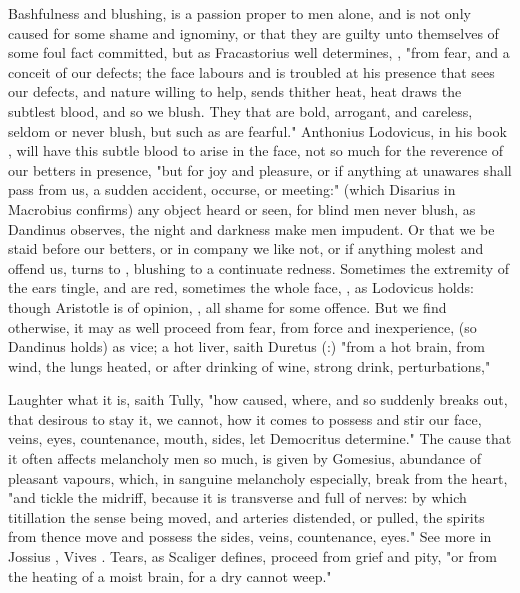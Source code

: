 {Bashfulness and blushing, is a passion proper to men
alone, and is not only caused for some shame and ignominy,
or that they are guilty unto themselves of some foul fact committed, but as
Fracastorius well determines, , "from fear, and a conceit of our defects; the face labours and is
troubled at his presence that sees our defects, and nature willing to help,
sends thither heat, heat draws the subtlest blood, and so we blush. They that
are bold, arrogant, and careless, seldom or never blush, but such as are
fearful." Anthonius Lodovicus, in his book ,
will have this subtle blood to arise in the face, not so much for the reverence
of our betters in presence, "but for joy and pleasure, or
if anything at unawares shall pass from us, a sudden accident, occurse, or
meeting:" (which Disarius in Macrobius confirms) any
object heard or seen, for blind men never blush, as Dandinus observes, the
night and darkness make men impudent. Or that we be staid before our betters,
or in company we like not, or if anything molest and offend us,
 turns to , blushing to a continuate redness.
Sometimes the extremity of the ears tingle, and are red,
sometimes the whole face, , as Lodovicus
holds: though Aristotle is of opinion, , all
shame for some offence. But we find otherwise, it may as well proceed
from fear, from force and inexperience, (so
Dandinus holds) as vice; a hot liver, saith Duretus
(:) "from a hot brain, from wind, the lungs heated, or
after drinking of wine, strong drink, perturbations," \etc{}

Laughter what it is, saith Tully, "how caused, where, and
so suddenly breaks out, that desirous to stay it, we cannot, how it comes to
possess and stir our face, veins, eyes, countenance, mouth, sides, let
Democritus determine." The cause that it often affects melancholy men so much,
is given by Gomesius, 
abundance of pleasant vapours, which, in sanguine melancholy especially, break
from the heart, "and tickle the midriff, because it is
transverse and full of nerves: by which titillation the sense being moved, and
arteries distended, or pulled, the spirits from thence move and possess the
sides, veins, countenance, eyes." See more in Jossius , Vives . Tears, as Scaliger
defines, proceed from grief and pity, "or from the heating
of a moist brain, for a dry cannot weep."

}
